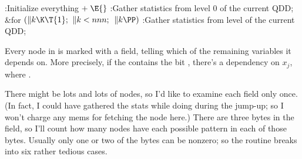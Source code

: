 \Y\B\4:Initialize everything\X${}\mathrel+\E{}$\6
:Gather statistics from level 0 of the current QDD\X;\6
\&{for} ${}(\|k\K\T{1};{}$ ${}\|k<\\{nnn};{}$ ${}\|k\PP){}$\1\5
:Gather statistics from level  of the current QDD\X;\2\par
\fi

Every node in  is marked with a  field, telling which
of the remaining variables it depends on. More precisely, if the 
contains the bit , there's a dependency on $x_j$, where .

There might be lots and lots of nodes, so I'd like to examine each 
field only once. (In fact, I could have gathered the stats while doing
 during the jump-up; so I won't charge any mems for
fetching the node here.) There are three bytes in the  field,
so I'll count how many nodes have each possible pattern in each
of those bytes. Usually only one or two of the bytes can be nonzero;
so the routine breaks into six rather tedious cases.

